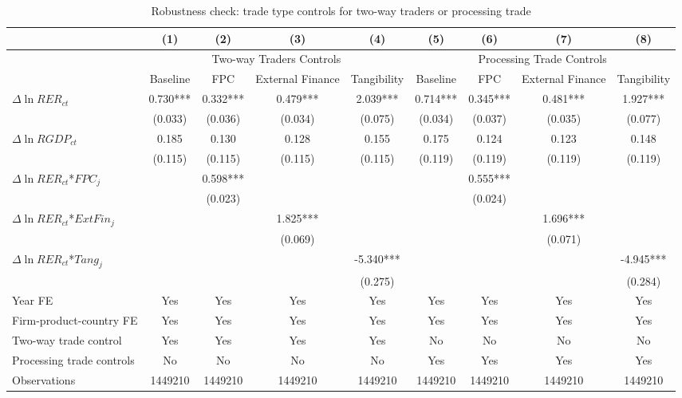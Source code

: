 \documentclass[12pt]{article}
\begin{document}
\begin{table}
	\centering
	\caption{Robustness check: trade type controls for two-way traders or processing trade}
	\begin{threeparttable}
		\begin{tabular}{lcccccccc}
			\toprule
			& (1)   & (2)   & (3)   & (4) &  (5)  &  (6)   & (7)   & (8)\\
			\midrule
			& \multicolumn{4}{c}{Two-way Traders Controls} & \multicolumn{4}{c}{Processing Trade Controls}\\
			& Baseline & FPC & External Finance & Tangibility & Baseline & FPC & External Finance & Tangibility\\
			\midrule
			$\Delta \ln RER_{ct}$ & 0.730*** & 0.332*** & 0.479*** & 2.039*** & 0.714*** & 0.345*** & 0.481*** & 1.927***\\
			& (0.033) & (0.036) & (0.034) & (0.075) & (0.034) & (0.037) & (0.035) & (0.077)\\
			$\Delta \ln RGDP_{ct}$ & 0.185 & 0.130 & 0.128 & 0.155 & 0.175 & 0.124 & 0.123 & 0.148\\
			& (0.115) & (0.115) & (0.115) & (0.115) & (0.119) & (0.119) & (0.119) & (0.119)\\
			$\Delta \ln RER_{ct}$*$FPC_{j}$ &       & 0.598*** &       &  & & 0.555*** &&\\
			&       & (0.023) &       &  &&(0.024)&&\\
			$\Delta \ln RER_{ct}$*$ExtFin_{j}$ &       &       & 1.825*** &  &&& 1.696*** &\\
			&       &       & (0.069) &  &&&(0.071)&\\
			$\Delta \ln RER_{ct}$*$Tang_{j}$ &       &       &       & -5.340*** &&&  & -4.945***\\
			&       &       &       & (0.275) &&&& (0.284)\\
			Year FE  &  Yes   & Yes   & Yes   & Yes &  Yes   & Yes   & Yes   & Yes\\
			Firm-product-country FE &  Yes   & Yes   & Yes   & Yes &  Yes   & Yes   & Yes   & Yes\\
			Two-way trade control &  Yes   & Yes   & Yes   & Yes & No & No & No & No\\
			Processing trade controls & No & No & No & No &  Yes   & Yes   & Yes  & Yes \\
			Observations & 1449210 & 1449210 & 1449210 & 1449210 & 1449210 & 1449210 & 1449210 & 1449210\\
			\bottomrule
		\end{tabular}

\end{threeparttable}
\end{table}
\end{document}
